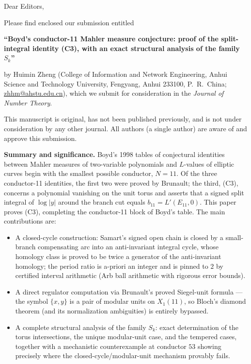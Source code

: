 \documentclass[11pt]{article}
\begin{document}
\thispagestyle{empty}

Dear Editors,

Please find enclosed our submission entitled

\begin{center}
\textbf{``Boyd's conductor-11 Mahler measure conjecture: proof of the
split-integral identity (C3), with an exact structural analysis of the
family $S_k$''}
\end{center}

by Huimin Zheng (College of Information and Network Engineering, Anhui
Science and Technology University, Fengyang, Anhui 233100, P.~R.~China;
\url{zhhm@ahstu.edu.cn}), which we submit for consideration in the
\emph{Journal of Number Theory}.

This manuscript is original, has not been published previously, and is
not under consideration by any other journal. All authors (a single
author) are aware of and approve this submission.

\textbf{Summary and significance.} Boyd's 1998 tables of conjectural
identities between Mahler measures of two-variable polynomials and
$L$-values of elliptic curves begin with the smallest possible
conductor, $N=11$. Of the three conductor-11 identities, the first two
were proved by Brunault; the third, (C3), concerns a polynomial
vanishing on the unit torus and asserts that a signed split integral of
$\log|y|$ around the branch cut equals $b_{11}=L'(E_{11},0)$. This
paper proves (C3), completing the conductor-11 block of Boyd's table.
The main contributions are:
\begin{itemize}
\item A closed-cycle construction: Samart's signed open chain is closed
by a small-branch compensating arc into an anti-invariant integral
cycle, whose homology class is proved to be twice a generator of the
anti-invariant homology; the period ratio is a-priori an integer and
is pinned to $2$ by certified interval arithmetic (Arb ball arithmetic
with rigorous error bounds).
\item A direct regulator computation via Brunault's proved Siegel-unit
formula --- the symbol $\{x,y\}$ is a pair of modular units on
$X_1(11)$, so Bloch's diamond theorem (and its normalization
ambiguities) is entirely bypassed.
\item A complete structural analysis of the family $S_k$: exact
determination of the torus intersections, the unique modular-unit
case, and the tempered cases, together with a mechanistic
counterexample at conductor $53$ showing precisely where the
closed-cycle/modular-unit mechanism provably fails.
\end{itemize}
\end{document}
